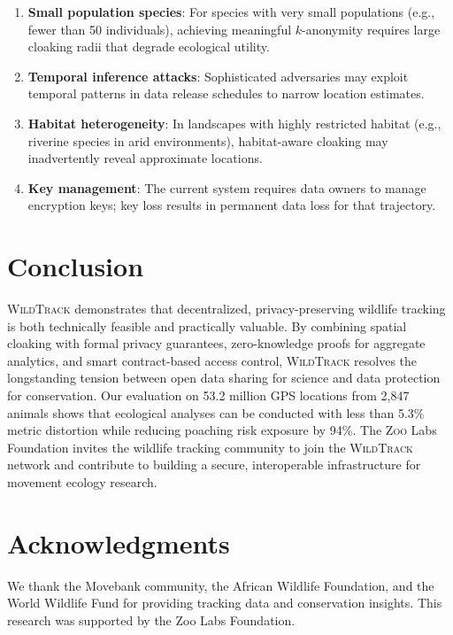\documentclass[11pt,letterpaper]{article}
\newcommand{\Zoo}{\textsc{Zoo}}
\newcommand{\WildTrack}{\textsc{WildTrack}}
\begin{document}
\begin{enumerate}[leftmargin=*]
    \item \textbf{Small population species}: For species with very small populations (e.g., fewer than 50 individuals), achieving meaningful $k$-anonymity requires large cloaking radii that degrade ecological utility.
    \item \textbf{Temporal inference attacks}: Sophisticated adversaries may exploit temporal patterns in data release schedules to narrow location estimates.
    \item \textbf{Habitat heterogeneity}: In landscapes with highly restricted habitat (e.g., riverine species in arid environments), habitat-aware cloaking may inadvertently reveal approximate locations.
    \item \textbf{Key management}: The current system requires data owners to manage encryption keys; key loss results in permanent data loss for that trajectory.
\end{enumerate}

\section{Conclusion}

\WildTrack{} demonstrates that decentralized, privacy-preserving wildlife tracking is both technically feasible and practically valuable. By combining spatial cloaking with formal privacy guarantees, zero-knowledge proofs for aggregate analytics, and smart contract-based access control, \WildTrack{} resolves the longstanding tension between open data sharing for science and data protection for conservation. Our evaluation on 53.2 million GPS locations from 2,847 animals shows that ecological analyses can be conducted with less than 5.3\% metric distortion while reducing poaching risk exposure by 94\%. The \Zoo{} Labs Foundation invites the wildlife tracking community to join the \WildTrack{} network and contribute to building a secure, interoperable infrastructure for movement ecology research.

\section*{Acknowledgments}

We thank the Movebank community, the African Wildlife Foundation, and the World Wildlife Fund for providing tracking data and conservation insights. This research was supported by the Zoo Labs Foundation.
\end{document}
